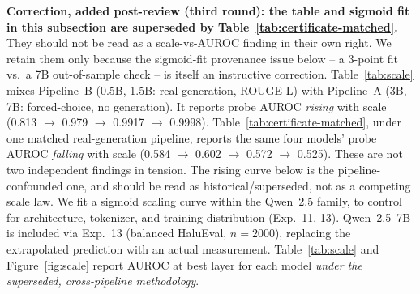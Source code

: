 \documentclass[onecolumn]{jmlr}
\begin{document}
\textbf{Correction, added post-review (third round): the table and
sigmoid fit in this subsection are superseded by
Table~\ref{tab:certificate-matched}.} They should not be read as a
scale-vs-AUROC finding in their own right. We retain them only because
the sigmoid-fit provenance issue below -- a 3-point fit vs.\ a 7B
out-of-sample check -- is itself an instructive correction.
Table~\ref{tab:scale} mixes Pipeline~B (0.5B, 1.5B: real generation,
ROUGE-L) with Pipeline~A (3B, 7B: forced-choice, no generation). It
reports probe AUROC \emph{rising} with scale (0.813 $\to$ 0.979 $\to$
0.9917 $\to$ 0.9998). Table~\ref{tab:certificate-matched}, under one
matched real-generation pipeline, reports the same four models' probe
AUROC \emph{falling} with scale (0.584 $\to$ 0.602 $\to$ 0.572 $\to$
0.525). These are not two independent findings in tension. The rising
curve below is the pipeline-confounded one, and should be read as
historical/superseded, not as a competing scale law. We fit a sigmoid
scaling curve within the Qwen~2.5 family, to control for architecture,
tokenizer, and training distribution (Exp.~11, 13). Qwen~2.5~7B is
included via Exp.~13 (balanced HaluEval, $n=2000$), replacing the
extrapolated prediction with an actual measurement. Table~\ref{tab:scale}
and Figure~\ref{fig:scale} report AUROC at best layer for each model
\emph{under the superseded, cross-pipeline methodology}.

\begin{table}[!htbp]
\centering
\caption{Qwen~2.5 family: best-layer probe AUROC vs.\ model scale
  (Exp.~11, 13; $n = 400$ controlled for 0.5B--3B; $n=2000$ for 7B).
  $^\ddagger$7B: Exp.~13 actual measurement, replacing the extrapolated
  prediction from Exp.~11.}
\label{tab:scale}
\small
\setlength{\tabcolsep}{5pt}
\end{table}
\end{document}
